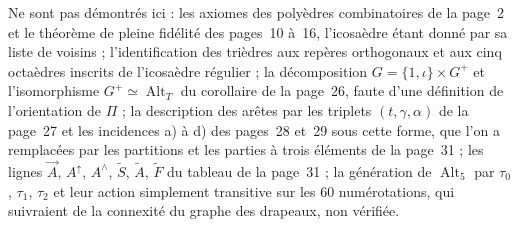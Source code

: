 Ne sont pas démontrés ici : les axiomes des polyèdres combinatoires de la page~2 et le théorème de pleine fidélité des pages~10 à~16, l'icosaèdre étant donné par sa liste de voisins ; l'identification des trièdres aux repères orthogonaux et aux cinq octaèdres inscrits de l'icosaèdre régulier ; la décomposition $G = \{1, \iota\} \times G^{+}$ et l'isomorphisme $G^{+} \simeq \operatorname{Alt}_T$ du corollaire de la page~26, faute d'une définition de l'orientation de $\Pi$ ; la description des arêtes par les triplets $(t, \gamma, \alpha)$ de la page~27 et les incidences a) à d) des pages~28 et~29 sous cette forme, que l'on a remplacées par les partitions et les parties à trois éléments de la page~31 ; les lignes $\vec A$, $A^{\uparrow}$, $A^{\wedge}$, $\tilde S$, $\tilde A$, $\tilde F$ du tableau de la page~31 ; la génération de $\operatorname{Alt}_5$ par $\tau_0$, $\tau_1$, $\tau_2$ et leur action simplement transitive sur les $60$ numérotations, qui suivraient de la connexité du graphe des drapeaux, non vérifiée.
